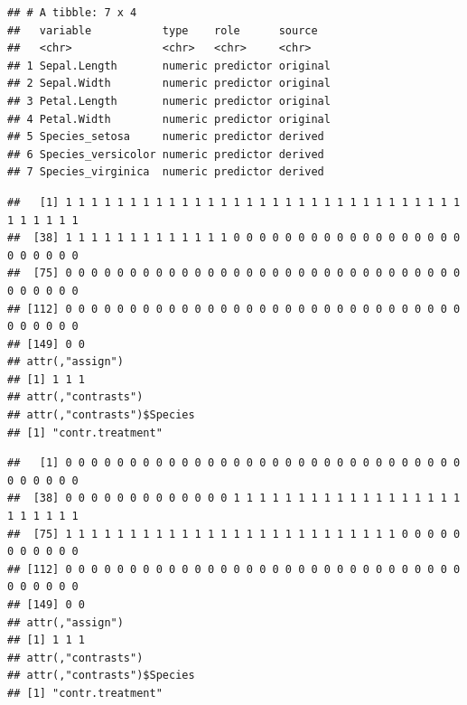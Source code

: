 \documentclass[
]{book}
\newenvironment{Shaded}{\begin{snugshade}}{\end{snugshade}}
\newcommand{\NormalTok}[1]{#1}
\newcommand{\OperatorTok}[1]{\textcolor[rgb]{0.81,0.36,0.00}{\textbf{#1}}}
\begin{document}
\begin{verbatim}
## # A tibble: 7 x 4
##   variable           type    role      source  
##   <chr>              <chr>   <chr>     <chr>   
## 1 Sepal.Length       numeric predictor original
## 2 Sepal.Width        numeric predictor original
## 3 Petal.Length       numeric predictor original
## 4 Petal.Width        numeric predictor original
## 5 Species_setosa     numeric predictor derived 
## 6 Species_versicolor numeric predictor derived 
## 7 Species_virginica  numeric predictor derived
\end{verbatim}

\begin{Shaded}
\end{Shaded}

\begin{verbatim}
##   [1] 1 1 1 1 1 1 1 1 1 1 1 1 1 1 1 1 1 1 1 1 1 1 1 1 1 1 1 1 1 1 1 1 1 1 1 1 1
##  [38] 1 1 1 1 1 1 1 1 1 1 1 1 1 0 0 0 0 0 0 0 0 0 0 0 0 0 0 0 0 0 0 0 0 0 0 0 0
##  [75] 0 0 0 0 0 0 0 0 0 0 0 0 0 0 0 0 0 0 0 0 0 0 0 0 0 0 0 0 0 0 0 0 0 0 0 0 0
## [112] 0 0 0 0 0 0 0 0 0 0 0 0 0 0 0 0 0 0 0 0 0 0 0 0 0 0 0 0 0 0 0 0 0 0 0 0 0
## [149] 0 0
## attr(,"assign")
## [1] 1 1 1
## attr(,"contrasts")
## attr(,"contrasts")$Species
## [1] "contr.treatment"
\end{verbatim}

\begin{Shaded}
\end{Shaded}

\begin{verbatim}
##   [1] 0 0 0 0 0 0 0 0 0 0 0 0 0 0 0 0 0 0 0 0 0 0 0 0 0 0 0 0 0 0 0 0 0 0 0 0 0
##  [38] 0 0 0 0 0 0 0 0 0 0 0 0 0 1 1 1 1 1 1 1 1 1 1 1 1 1 1 1 1 1 1 1 1 1 1 1 1
##  [75] 1 1 1 1 1 1 1 1 1 1 1 1 1 1 1 1 1 1 1 1 1 1 1 1 1 1 0 0 0 0 0 0 0 0 0 0 0
## [112] 0 0 0 0 0 0 0 0 0 0 0 0 0 0 0 0 0 0 0 0 0 0 0 0 0 0 0 0 0 0 0 0 0 0 0 0 0
## [149] 0 0
## attr(,"assign")
## [1] 1 1 1
## attr(,"contrasts")
## attr(,"contrasts")$Species
## [1] "contr.treatment"
\end{verbatim}

\begin{Shaded}
\end{Shaded}
\end{document}
